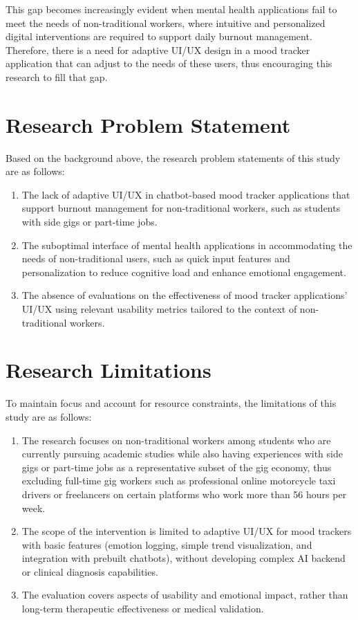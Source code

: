 This gap becomes increasingly evident when mental health applications fail to meet the needs of non-traditional workers, where intuitive and personalized digital interventions are required to support daily burnout management. Therefore, there is a need for adaptive UI/UX design in a mood tracker application that can adjust to the needs of these users, thus encouraging this research to fill that gap.

\section{Research Problem Statement}

Based on the background above, the research problem statements of this study are as follows:

\begin{enumerate}
	\item The lack of adaptive UI/UX in chatbot-based mood tracker applications that support burnout management for non-traditional workers, such as students with side gigs or part-time jobs.
	\item The suboptimal interface of mental health applications in accommodating the needs of non-traditional users, such as quick input features and personalization to reduce cognitive load and enhance emotional engagement.
	\item The absence of evaluations on the effectiveness of mood tracker applications' UI/UX using relevant usability metrics tailored to the context of non-traditional workers.
\end{enumerate}

\section{Research Limitations}

To maintain focus and account for resource constraints, the limitations of this study are as follows:

\begin{enumerate}
	\item The research focuses on non-traditional workers among students who are currently pursuing academic studies while also having experiences with side gigs or part-time jobs as a representative subset of the gig economy, thus excluding full-time gig workers such as professional online motorcycle taxi drivers or freelancers on certain platforms who work more than 56 hours per week.
	\item The scope of the intervention is limited to adaptive UI/UX for mood trackers with basic features (emotion logging, simple trend visualization, and integration with prebuilt chatbots), without developing complex AI backend or clinical diagnosis capabilities.
	\item The evaluation covers aspects of usability and emotional impact, rather than long-term therapeutic effectiveness or medical validation.
\end{enumerate}

